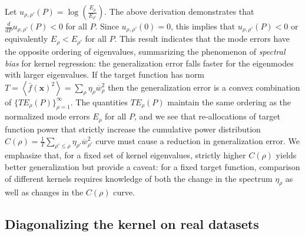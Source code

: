 \documentclass[11pt]{article}
\def\x{{\mathbf x}}
\begin{document}
Let $u_{\rho,\rho'}(P) = \log\left( \frac{E_\rho}{E_{\rho'}} \right)$. The above derivation demonstrates that $\frac{d}{dP} u_{\rho,\rho'}(P) < 0$ for all $P$. Since $u_{\rho,\rho'}(0) = 0$,  this implies that $u_{\rho,\rho'}(P) < 0$ or equivalently $E_\rho < E_{\rho'}$ for all $P$. This result indicates that the mode errors have the opposite ordering of eigenvalues, summarizing the phenomenon of \textit{spectral bias} for kernel regression: the generalization error falls faster for the eigenmodes with larger eigenvalues. If the target function has norm $T = \left<\bar f(\x)^2\right>=\sum_{\rho} \eta_{\rho} \overline{w}_{\rho}^2$ then the generalization error is a convex combination of $\{ T E_\rho(P) \}_{\rho=1}^{\infty}$. The quantities $T E_\rho(P)$ maintain the same ordering as the normalized mode errors $E_\rho$ for all $P$, and we see that re-allocations of target function power that strictly increase the cumulative power distribution $C(\rho) = \frac{1}{T} \sum_{\rho' \leq \rho} \eta_{\rho'} \overline{w}_{\rho'}^2 $ curve must cause a reduction in generalization error. We emphasize that, for a fixed set of kernel eigenvalues, strictly higher $C(\rho)$ yields better generalization but provide a caveat: for a fixed target function, comparison of different kernels requires knowledge of both the change in the spectrum $\eta_\rho$ as well as changes in the $C(\rho)$ curve.

\subsection*{Diagonalizing the kernel on real datasets}
\end{document}
